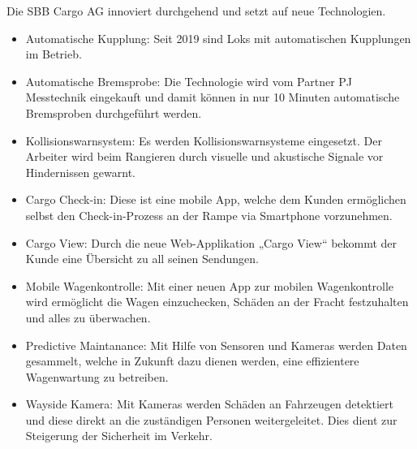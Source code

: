 \documentclass{article}
\begin{document}
Die SBB Cargo AG innoviert durchgehend und setzt auf neue Technologien.
\begin{itemize}
    \item Automatische Kupplung: Seit 2019 sind Loks mit automatischen Kupplungen im Betrieb.
    \item Automatische Bremsprobe: Die Technologie wird vom Partner PJ Messtechnik eingekauft und damit können in nur 10 Minuten automatische Bremsproben durchgeführt werden.
    \item Kollisionswarnsystem: Es werden Kollisionswarnsysteme eingesetzt. Der Arbeiter wird beim Rangieren durch visuelle und akustische Signale vor Hindernissen gewarnt.
    \item Cargo Check-in: Diese ist eine mobile App, welche dem Kunden ermöglichen selbst den Check-in-Prozess an der Rampe via Smartphone vorzunehmen.
    \item Cargo View: Durch die neue Web-Applikation „Cargo View“ bekommt der Kunde eine Übersicht zu all seinen Sendungen.
    \item Mobile Wagenkontrolle: Mit einer neuen App zur mobilen Wagenkontrolle wird ermöglicht die Wagen einzuchecken, Schäden an der Fracht festzuhalten und alles zu überwachen.
    \item Predictive Maintanance: Mit Hilfe von Sensoren und Kameras werden Daten gesammelt, welche in Zukunft dazu dienen werden, eine effizientere Wagenwartung zu betreiben.
    \item Wayside Kamera: Mit Kameras werden Schäden an Fahrzeugen detektiert und diese direkt an die zuständigen Personen weitergeleitet. Dies dient zur Steigerung der Sicherheit im Verkehr.
\end{itemize}
\parencite[o. S.]{innovation}

\cleardoublepage
\end{document}
